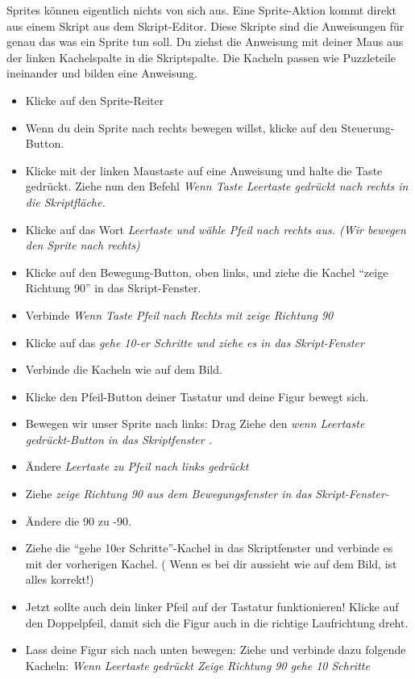 Sprites können eigentlich nichts von sich aus. Eine Sprite-Aktion kommt direkt aus einem Skript aus dem Skript-Editor. Diese Skripte sind die Anweisungen für genau das was ein Sprite tun soll.
Du ziehst die Anweisung mit deiner Maus aus der linken Kachelspalte in die Skriptspalte. Die Kacheln passen wie Puzzleteile ineinander und bilden eine Anweisung.


\begin{itemize}
\item Klicke auf den Sprite-Reiter
\item Wenn du dein Sprite nach rechts bewegen willst, klicke auf den Steuerung-Button.
\item Klicke mit der linken Maustaste auf eine Anweisung und halte die Taste gedrückt. Ziehe nun den Befehl \it{Wenn Taste Leertaste gedrückt} nach rechts in die Skriptfläche. 
\item Klicke auf das Wort \it{Leertaste} und wähle \it{Pfeil nach rechts} aus.  (Wir bewegen den Sprite nach rechts)
\item Klicke auf den Bewegung-Button, oben links, und ziehe die Kachel “zeige Richtung 90” in das Skript-Fenster.
\item Verbinde \it{Wenn Taste Pfeil nach Rechts} mit \it{zeige Richtung 90}
\item Klicke auf das \it{gehe 10-er Schritte} und ziehe es in das Skript-Fenster 
\item Verbinde die Kacheln wie auf dem Bild. 
\item Klicke den Pfeil-Button deiner Tastatur und deine Figur bewegt sich.
\item Bewegen wir unser Sprite nach links: Drag Ziehe den \it{wenn Leertaste gedrückt}-Button in das Skriptfenster .
\item Ändere \it{Leertaste} zu \it{Pfeil nach links gedrückt}
\item Ziehe \it{zeige Richtung 90} aus dem Bewegungsfenster in das Skript-Fenster-
\item Ändere die 90 zu -90.
\item Ziehe die “gehe 10er Schritte”-Kachel in das Skriptfenster und verbinde es mit der vorherigen Kachel.
( Wenn es bei dir aussieht wie auf dem Bild, ist alles korrekt!)
\item Jetzt sollte auch dein linker Pfeil auf der Tastatur funktionieren! Klicke auf den Doppelpfeil, damit sich die Figur auch in die richtige Laufrichtung dreht. 
\item Lass deine Figur sich nach unten bewegen: Ziehe und verbinde dazu folgende Kacheln:
\subitem \it{Wenn Leertaste gedrückt}
\subitem \it{Zeige Richtung 90}
\subitem \it{gehe 10 Schritte}
\end{itemize}


